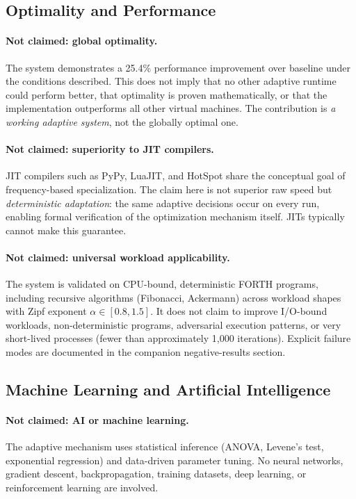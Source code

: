 \subsection{Optimality and Performance}

\paragraph{Not claimed: global optimality.}
The system demonstrates a 25.4\% performance improvement over baseline under
the conditions described. This does not imply that no other adaptive runtime
could perform better, that optimality is proven mathematically, or that the
implementation outperforms all other virtual machines. The contribution is
\emph{a working adaptive system}, not the globally optimal one.

\paragraph{Not claimed: superiority to JIT compilers.}
JIT compilers such as PyPy, LuaJIT, and HotSpot share the conceptual goal of
frequency-based specialization. The claim here is not superior raw speed but
\emph{deterministic adaptation}: the same adaptive decisions occur on every
run, enabling formal verification of the optimization mechanism itself. JITs
typically cannot make this guarantee.

\paragraph{Not claimed: universal workload applicability.}
The system is validated on CPU-bound, deterministic FORTH programs, including
recursive algorithms (Fibonacci, Ackermann) across workload shapes with Zipf
exponent $\alpha \in [0.8, 1.5]$. It does not claim to improve I/O-bound
workloads, non-deterministic programs, adversarial execution patterns, or very
short-lived processes (fewer than approximately 1{,}000 iterations). Explicit
failure modes are documented in the companion negative-results section.

\subsection{Machine Learning and Artificial Intelligence}

\paragraph{Not claimed: AI or machine learning.}
The adaptive mechanism uses statistical inference (ANOVA, Levene's test,
exponential regression) and data-driven parameter tuning. No neural networks,
gradient descent, backpropagation, training datasets, deep learning, or
reinforcement learning are involved.

